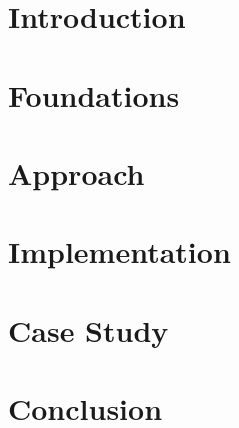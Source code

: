 \documentclass[
    pagesize,%
    a4paper,%
    headsepline,%
    footsepline,%
    headinclude,%
    footinclude,%
    bibtotoc,%
    cleardoubleplain,%
    tablecaptionabove,%
]{scrreprt}
\begin{document}


\areaset[1cm]{17cm}{27cm}%
\makecover



\pagestyle{headings}

\tableofcontents


\setcounter{page}{3}


\clearpage
\chapter{Introduction}
\label{chap:introduction}


\clearpage
\chapter{Foundations}
\label{chap:foundations}


\chapter{Approach}
\label{chap:approach}


\clearpage
\chapter{Implementation}
\label{chap:implementation}


\clearpage
\chapter{Case Study}
\label{chap:casestudy}



\chapter{Conclusion}
\label{chap:conclusion}


%

%

\clearpage


\end{document}
